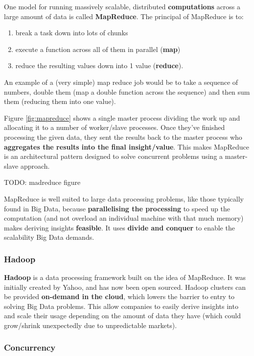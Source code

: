 \documentclass{article}
\begin{document}
One model for running massively scalable, distributed \textbf{computations} across a large amount of data is called \textbf{MapReduce}. The principal of MapReduce is to:
\begin{enumerate}
	\item break a task down into lots of chunks
	\item execute a function across all of them in parallel (\textbf{map})
	\item reduce the resulting values down into 1 value (\textbf{reduce}).
\end{enumerate}
An example of a (very simple) map reduce job would be to take a sequence of numbers, double them (map a double function across the sequence) and then sum them (reducing them into one value).

Figure \ref{fig:mapreduce} shows a single master process dividing the work up and allocating it to a number of worker/slave processes. Once they've finished processing the given data, they sent the results back to the master process who \textbf{aggregates the results into the final insight/value}. This makes MapReduce is an architectural pattern designed to solve concurrent problems using a master-slave approach.

TODO: madreduce figure

MapReduce is well suited to large data processing problems, like those typically found in Big Data, because \textbf{parallelising the processing} to speed up the computation (and not overload an individual machine with that much memory) makes deriving insights \textbf{feasible}. It uses \textbf{divide and conquer} to enable the scalability Big Data demands.

\subsubsection{Hadoop}

\textbf{Hadoop} is a data processing framework built on the idea of MapReduce. It was initially created by Yahoo, and has now been open sourced. Hadoop clusters can be provided \textbf{on-demand in the cloud}, which lowers the barrier to entry to solving Big Data problems. This allow companies to easily derive insights into and scale their usage depending on the amount of data they have (which could grow/shrink unexpectedly due to unpredictable markets).

\subsubsection{Concurrency}
\end{document}
